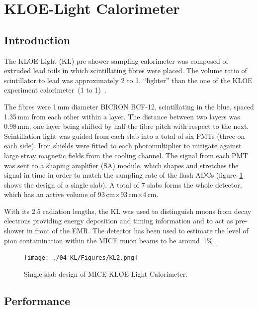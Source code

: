 \graphicspath{{04-KL/Figures/}}

\section{KLOE-Light Calorimeter}
\label{Sect:KL}

\subsection{Introduction}
\label{SubSect:KL_Intro}

The KLOE-Light (KL) pre-shower sampling calorimeter was composed of extruded lead foils in which scintillating fibres were placed. The volume ratio of scintillator to lead was approximately 2 to 1, ``lighter'' than the one of the KLOE experiment calorimeter~(1 to 1)~\cite{Ambrosino:2009zza}.

The fibres were 1\,mm diameter BICRON BCF-12, scintillating in the blue, spaced 1.35\,mm from each other within a layer. The distance between two layers was 0.98\,mm, one layer being shifted by half the fibre pitch with respect to the next.
Scintillation light was guided from each slab into a total of six PMTs (three on each side). Iron shields were fitted to each photomultiplier to
mitigate against large stray magnetic fields from the cooling channel. The signal from each PMT was sent to a shaping amplifier (SA) module, which shapes and stretches the signal in time in order to match the sampling rate of the flash ADCs (figure~\ref{fig:KL2} shows the design of a single slab).
A total of 7 slabs forms the whole detector, which has an active volume of 93\,cm$\times$93\,cm$\times$4\,cm.

With its 2.5 radiation lengths, the KL was used to distinguish muons from decay electrons providing energy deposition and timing information and to act as pre-shower in front of the EMR.
The detector has been used to estimate the level of pion contamination within the MICE muon beams to be around~1\%~\cite{2016JInst..11P3001A}.
\begin{figure}
  \begin{center}
    \texttt{[image: ./04-KL/Figures/KL2.png]}
    \caption{Single slab design of MICE KLOE-Light Calorimeter.}
    \label{fig:KL2}
  \end{center}
\end{figure}



\subsection{Performance}
\label{SubSect:KL_Performance}

